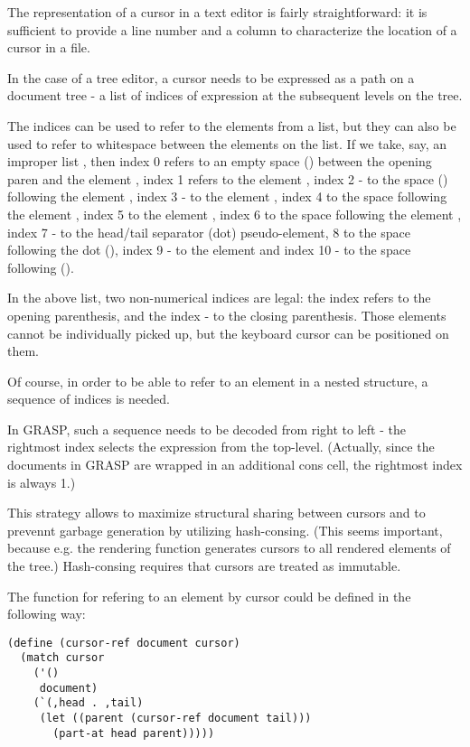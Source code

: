 \documentclass[11pt]{article}
\begin{document}
The representation of a cursor in a text editor is fairly
straightforward: it is sufficient to provide a line number
and a column to characterize the location of a cursor
in a file.

In the case of a tree editor, a cursor needs to be expressed
as a path on a document tree - a list of indices
of expression at the subsequent levels on the tree.

The indices can be used to refer to the elements
from a list, but they can also be used to refer to
whitespace between the elements on the list. If we take,
say, an improper list , then index 0
refers to an empty space () between 
the opening paren and the element , index 1 refers 
to the element , index 2 - to the space 
()
following the element , index 3 - to the element 
,
index 4 to the space following the element ,
index 5 to the element , index 6 to the space following
the element , index 7 - to the head/tail 
separator (dot) pseudo-element, 8 to the space following the dot
(), index 9 - to the element 
and index 10 - to the space following 
().

In the above list, two non-numerical indices are legal:
the index refers to the opening parenthesis,
and the index - to the closing parenthesis. Those
elements cannot be individually picked up, but the keyboard
cursor can be positioned on them.

Of course, in order to be able to refer to an element
in a nested structure, a sequence of indices is needed.

In GRASP, such a sequence needs to be decoded from right
to left - the rightmost index selects the expression
from the top-level. (Actually, since the documents in
GRASP are wrapped in an additional cons cell, the rightmost
index is always 1.)

This strategy allows to maximize structural sharing
between cursors and to prevennt garbage generation
by utilizing hash-consing. (This seems important, because
e.g. the rendering function generates cursors to all
rendered elements of the tree.)
Hash-consing requires that cursors are treated as
immutable.

The function for refering to an element by cursor
could be defined in the following way:

\begin{verbatim}
(define (cursor-ref document cursor)
  (match cursor
    ('()
     document)
    (`(,head . ,tail)
     (let ((parent (cursor-ref document tail)))
       (part-at head parent)))))
\end{verbatim}
\end{document}
